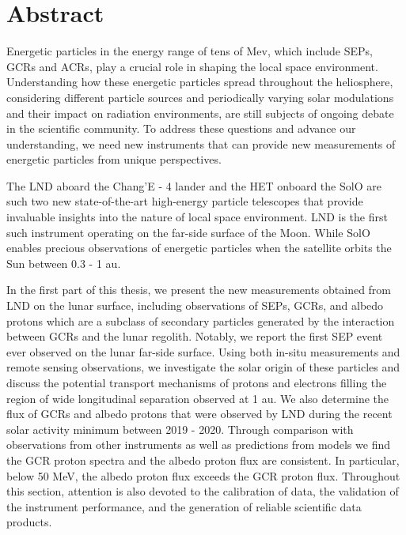 \chapter*{Abstract}
Energetic particles in the energy range of tens of Mev, which include \acp{SEP}, \acp{GCR} and \acp{ACR},  play a crucial role in shaping the local space environment. Understanding how these energetic particles spread throughout the heliosphere, considering different particle sources and periodically varying solar modulations and their impact on radiation environments, are still subjects of ongoing debate in the scientific community. To address these questions and advance our understanding, we need new instruments that can provide new measurements of energetic particles from unique perspectives.

The \ac{LND} aboard the Chang'E - 4 lander and the \ac{HET} onboard the \ac{SolO} are such two new state-of-the-art high-energy particle telescopes that provide invaluable insights into the nature of local space environment. \ac{LND} is the first such instrument operating on the far-side surface of the Moon. While \ac{SolO} enables precious observations of energetic particles when the satellite orbits the Sun between 0.3 - 1 au.

In the first part of this thesis, we present the new measurements obtained from \ac{LND} on the lunar surface, including observations of \acp{SEP}, \acp{GCR}, and albedo protons which are a subclass of secondary particles generated by the interaction between \acp{GCR} and the lunar regolith. Notably, we report the first \ac{SEP} event ever observed on the lunar far-side surface. Using both in-situ measurements and remote sensing observations, we investigate the solar origin of these particles and discuss the potential transport mechanisms of protons and electrons filling the region of wide longitudinal separation observed at 1 au. We also determine the flux of \acp{GCR} and albedo protons that were observed by \ac{LND} during the recent solar activity minimum between 2019 - 2020. Through comparison with observations from other instruments
as well as predictions from models
we find the \ac{GCR} proton spectra and the albedo proton flux are consistent. In particular, below 50 MeV, the albedo proton ﬂux exceeds the \ac{GCR} proton ﬂux.
Throughout this section, attention is also devoted to the calibration of data, the validation of the instrument performance, and the generation of reliable scientific data products.

